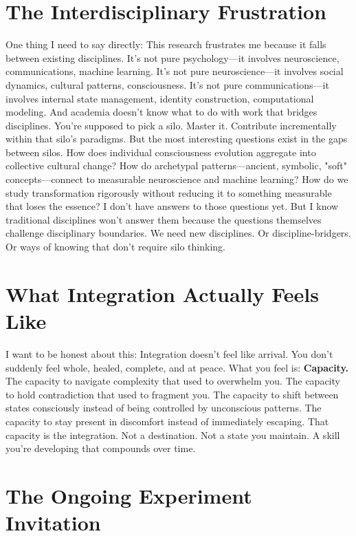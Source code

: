 \section{The Interdisciplinary Frustration}

One thing I need to say directly:
This research frustrates me because it falls between existing disciplines.
It's not pure psychology—it involves neuroscience, communications, machine learning.
It's not pure neuroscience—it involves social dynamics, cultural patterns, consciousness.
It's not pure communications—it involves internal state management, identity construction, computational modeling.
And academia doesn't know what to do with work that bridges disciplines.
You're supposed to pick a silo. Master it. Contribute incrementally within that silo's paradigms.
But the most interesting questions exist in the gaps between silos.
How does individual consciousness evolution aggregate into collective cultural change?
How do archetypal patterns—ancient, symbolic, "soft" concepts—connect to measurable neuroscience and machine learning?
How do we study transformation rigorously without reducing it to something measurable that loses the essence?
I don't have answers to those questions yet.
But I know traditional disciplines won't answer them because the questions themselves challenge disciplinary boundaries.
We need new disciplines. Or discipline-bridgers. Or ways of knowing that don't require silo thinking.

\section{What Integration Actually Feels Like}

I want to be honest about this:
Integration doesn't feel like arrival.
You don't suddenly feel whole, healed, complete, and at peace.
What you feel is: \textbf{Capacity.}
The capacity to navigate complexity that used to overwhelm you.
The capacity to hold contradiction that used to fragment you.
The capacity to shift between states consciously instead of being controlled by unconscious patterns.
The capacity to stay present in discomfort instead of immediately escaping.
That capacity is the integration.
Not a destination. Not a state you maintain. A skill you're developing that compounds over time.

\section{The Ongoing Experiment Invitation}

